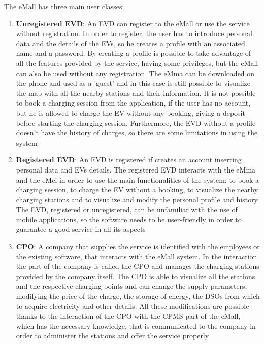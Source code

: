 The eMall has three main user classes:
\begin{enumerate}
    \item \textbf{Unregistered EVD}: An EVD can register to the eMall or use the service without registration. In order to register, the user has to introduce personal data and the details of the EVs, so he creates a profile with an associated name and a password. By creating a profile is possible to take advantage of all the features provided by the service, having some privileges, but the eMall can also be used without any registration. The eMma can be downloaded on the phone and used as a 'guest' and in this case is still possible to visualize the map with all the nearby stations and their information. It is not possible to book a charging session from the application, if the user has no account, but he is allowed to charge the EV without any booking, giving a deposit before starting the charging session. Furthermore, the EVD without a profile doesn't have the history of charges, so there are some limitations in using the system
    \item \textbf{Registered EVD}: An EVD is registered if creates an account inserting personal data and EVs details. The registered EVD interacts with the eMma and the eMci in order to use the main functionalities of the system: to book a charging session, to charge the EV without a booking, to visualize the nearby charging stations and to visualize and modify the personal profile and history. The EVD, registered or unregistered, can be unfamiliar with the use of mobile applications, so the software needs to be user-friendly in order to guarantee a good service in all its aspects 
    \item \textbf{CPO}: A company that supplies the service is identified with the employees or the existing software, that interacts with the eMall system. In the interaction the part of the company is called the CPO and manages the charging stations provided by the company itself. The CPO is able to visualize all the stations and the respective charging points and can change the supply parameters, modifying the price of the charge, the storage of energy, the DSOs from which to acquire electricity and other details. All these modifications are possible thanks to the interaction of the CPO with the CPMS part of the eMall, which has the necessary knowledge, that is communicated to the company in order to administer the stations and offer the service properly 
\end{enumerate}